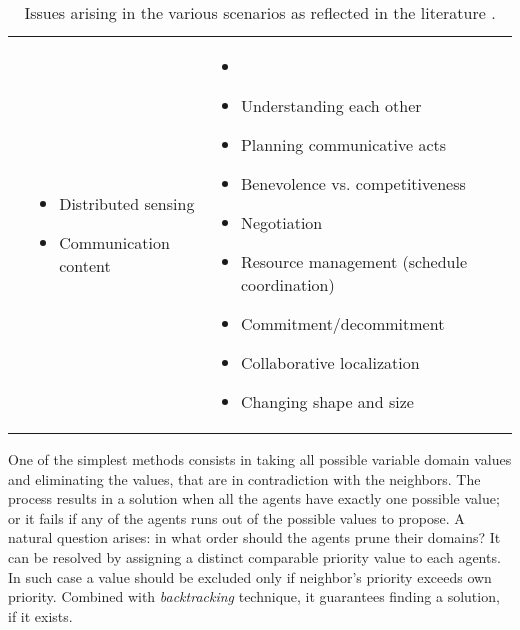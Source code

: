 \documentclass[../ThesisDoc]{subfiles}
\begin{document}
\begin{table}
\begin{tabular}{P{0.1\textwidth} P{0.3\textwidth}|P{0.4\textwidth}}
                      & \begin{minipage}{0.3\textwidth}
                        \footnotesize\begin{itemize}[leftmargin=5px, rightmargin=0px]
                          \item Distributed sensing
                          \item Communication content
                        \end{itemize}\end{minipage}
                      & \begin{minipage}{0.4\textwidth}
                        \footnotesize\begin{itemize}[leftmargin=10px, rightmargin=0px]
                          \item[]
                          \item Understanding each other
                          \item Planning communicative acts
                          \item Benevolence vs. competitiveness
                          \item Negotiation
                          \item Resource management (schedule coordination)
                          \item Commitment/decommitment
                          \item Collaborative localization
                          \item Changing shape and size
                        \end{itemize}\end{minipage}
  \end{tabular}
  \caption[Issues arising in the various scenarios as reflected in the literature]
          {Issues arising in the various scenarios as reflected in the literature
          \cite[Table~2]{MAS-Survey}.}
  \label{table:MAS-Table}
\end{table}




\bigskip
One of the simplest methods consists in taking all possible variable domain values
and eliminating the values, that are in contradiction with the neighbors.
The process results in a solution when all the agents have exactly one
possible value; or it fails if any of the agents runs out of the possible
values to propose. A natural question arises: in what order should the agents
prune their domains?
It can be resolved by assigning a distinct comparable priority value to each agents.
In such case a value should be excluded only if neighbor's priority exceeds own priority.
Combined with \emph{backtracking} technique, it guarantees finding a solution,
if it exists.
\end{document}
